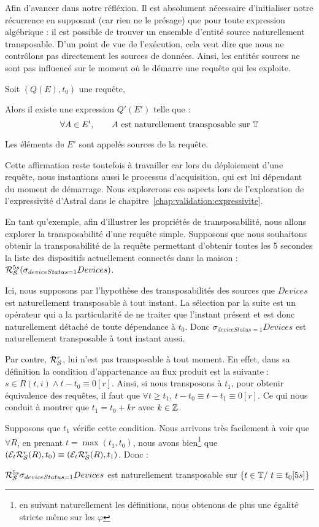 Afin d'avancer dans notre réfléxion. Il est absolument nécessaire d'initialiser notre récurrence en supposant (car rien ne le présage) que pour toute expression algébrique : il est possible de trouver un ensemble d'entité source naturellement transposable. D'un point de vue de l'exécution, cela veut dire que nous ne contrôlons pas directement les sources de données. Ainsi, les entités sources ne sont pas influencé sur le moment où le démarre une requête qui les exploite.
\begin{hyp}\label{hyp:transposabilite}
    Soit $(Q(E),t_0)$ une requête,

    Alors il existe une expression $Q'(E')$ telle que : $$\forall A\in E', \qquad A \textrm{ est naturellement transposable sur } \mathbb{T}$$
    
    Les éléments de $E'$ sont appelés sources de la requête.
\end{hyp}
Cette affirmation reste toutefois à travailler car lors du déploiement d'une requête, nous instantions aussi le processus d'acquisition, qui est lui dépendant du moment de démarrage. Nous explorerons ces aspects lors de l'exploration de l'expressivité d'Astral dans le chapitre~\ref{chap:validation:expressivite}.

\begin{example}\label{ex:transposabilite}
	En tant qu'exemple, afin d'illustrer les propriétés de transposabilité, nous allons explorer la transposabilité d'une requête simple. Supposons que nous souhaitons obtenir la transposabilité de la requête permettant d'obtenir toutes les 5 secondes la liste des dispositifs actuellement connectés dans la maison : $\mathcal{R}_{\mathcal S}^{5s} (\sigma_{deviceStatus=1} Devices)$. 
	
	Ici, nous supposons par l'hypothèse des transposabilités des sources que $Devices$ est naturellement transposable à tout instant. La sélection par la suite est un opérateur qui a la particularité de ne traiter que l'instant présent et est donc naturellement détaché de toute dépendance à $t_0$. Donc $\sigma_{deviceStatus=1} Devices$ est naturellement transposable à tout instant aussi.
	
	Par contre, $\mathcal{R}_{\mathcal S}^{r}$, lui n'est pas transposable à tout moment. En effet, dans sa définition la condition d'appartenance au flux produit est la suivante : $s \in R(t,i)\wedge t-t_0 \equiv 0[r]$. Ainsi, si nous transposons à $t_1$, pour obtenir équivalence des requêtes, il faut que $\forall t \geq t_1$, $t-t_0\equiv t-t_1\equiv 0[r]$.  Ce qui nous conduit à montrer que $t_1 = t_0 +kr$ avec $k\in \mathbb{Z}$. 
	
	Supposons que $t_1$ vérifie cette condition. Nous arrivons très facilement à voir que $\forall R$, en prenant $t=\max(t_1,t_0)$, nous avons bien\footnote{en suivant naturellement les définitions, nous obtenons de plus une égalité stricte même sur les $\varphi$} que $(\mathcal{E}_{t}\mathcal{R}_{\mathcal S}^{r}(R),t_0) \equiv (\mathcal{E}_{t}\mathcal{R}_{\mathcal S}^{r}(R),t_1)$. Donc :
	\begin{center}$\mathcal{R}_{\mathcal S}^{5s}\sigma_{deviceStatus=1} Devices$ est naturellement transposable sur $\{t\in \mathbb{T} /\ t\equiv t_0 [5s]\}$\end{center}
\end{example}

